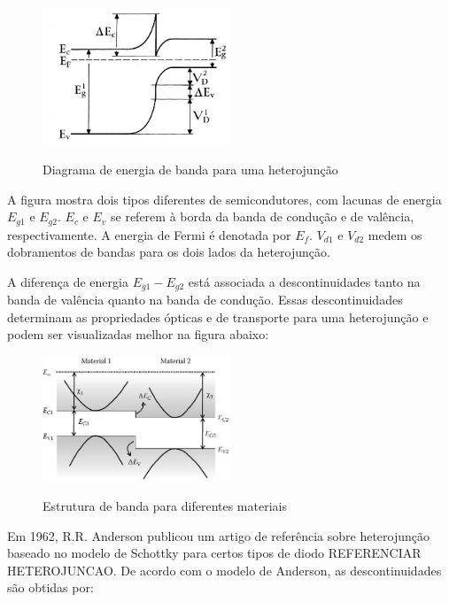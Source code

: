 	\begin{figure}[H]
	  \caption{Diagrama de energia de banda para uma heterojunção}
	  \centering
	  \includegraphics[width=0.5\textwidth]{images/figura14.jpg}
	  \label{fig14}
	\end{figure}

	\par A figura mostra dois tipos diferentes de semicondutores, com lacunas de energia $E_{g1}$ e $E_{g2}$. $E_{c}$ e $E_{v}$ se referem à borda da banda de condução e de valência, respectivamente. A energia de Fermi é denotada por $E_{f}$. $V_{d1}$ e $V_{d2}$ medem os dobramentos de bandas para os dois lados da heterojunção.

	\par A diferença de energia $E_{g1}-E_{g2}$ está associada a descontinuidades tanto na banda de valência quanto na banda de condução. Essas descontinuidades determinam as propriedades ópticas e de transporte para uma heterojunção e podem ser  visualizadas melhor na figura abaixo: 

	\begin{figure}[H]
	  \caption{Estrutura de banda para diferentes materiais}
	  \centering
	  \includegraphics[width=0.5\textwidth]{images/figura15.jpg}
	  \label{fig15}
	\end{figure}

	\par Em 1962, R.R. Anderson publicou um artigo de referência sobre heterojunção baseado no modelo de Schottky para certos tipos de diodo REFERENCIAR HETEROJUNCAO. De acordo com o modelo de Anderson, as descontinuidades são obtidas por:


